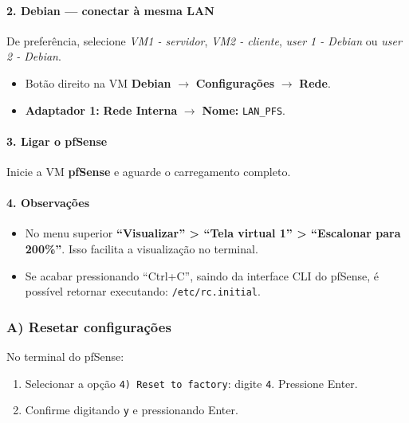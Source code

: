 
\paragraph{2. Debian --- conectar à mesma LAN}

\begin{notebox}
De preferência, selecione \textit{VM1 - servidor}, \textit{VM2 - cliente}, \textit{user 1 - Debian} ou \textit{user 2 - Debian}.
\end{notebox}

\begin{itemize}
  \item Botão direito na VM \textbf{Debian} $\rightarrow$ \textbf{Configurações} $\rightarrow$ \textbf{Rede}.
  \item \textbf{Adaptador 1:} \textbf{Rede Interna} $\rightarrow$ \textbf{Nome:} \texttt{LAN\_PFS}.
\end{itemize}


\paragraph{3. Ligar o pfSense} Inicie a VM \textbf{pfSense} e aguarde o carregamento completo.


\paragraph{4. Observações}
\begin{itemize}
  \item No menu superior \textbf{``Visualizar'' > ``Tela virtual 1'' > ``Escalonar para 200\%''}. Isso facilita a visualização no terminal.
  \item Se acabar pressionando ``Ctrl+C'', saindo da interface CLI do pfSense, é possível retornar executando: \texttt{/etc/rc.initial}.
\end{itemize}

\subsubsection*{A) Resetar configurações}

No terminal do pfSense:
\begin{enumerate}
  \item Selecionar a opção \texttt{4) Reset to factory}: digite \texttt{4}. Pressione Enter.
  \item Confirme digitando \texttt{y} e pressionando Enter.
\end{enumerate}

